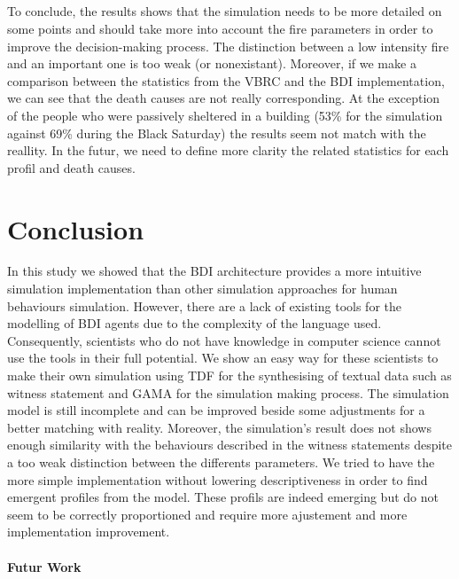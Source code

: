 \documentclass[12pt, a4paper]{memoir} %
\begin{document}
		\paragraph{}
		To conclude, the results shows that the simulation needs to be more detailed on some points and should take more into account
		the fire parameters in order to improve the decision-making process. The distinction between a low intensity fire and an
		important one is too weak (or nonexistant). Moreover, if we make a comparison between the statistics from the VBRC and the BDI
		implementation, we can see that the death causes are not really corresponding. At the exception of the people who were
		passively sheltered in a building (53\% for the simulation against 69\% during the Black Saturday) the results seem not match
		with the reallity. In the futur, we need to define more clarity the related statistics for each profil and death causes.

\chapter{Conclusion}

		In this study we showed that the BDI architecture provides a more intuitive simulation implementation than other simulation
		approaches for human behaviours simulation. However, there are a lack of existing tools for the modelling of BDI agents due
		to the complexity of the language used.
		Consequently, scientists who do not have knowledge in computer science cannot use the tools in their full potential.
		We show an easy way for these scientists to make their own simulation using TDF for the synthesising of textual data such
		as witness statement and GAMA for the simulation making process.
	  The simulation model is still incomplete and can be improved beside some adjustments for a better matching with reality.
		Moreover, the simulation's result does not shows enough similarity with the behaviours described in the witness statements
		despite a too weak distinction between the differents parameters.
  	We tried to have the more simple implementation without lowering descriptiveness in order to find emergent profiles from
		the model. These profils are indeed emerging but do not seem to be correctly proportioned and require more ajustement and
		more implementation improvement.

	\subsubsection{Futur Work}
\end{document}
